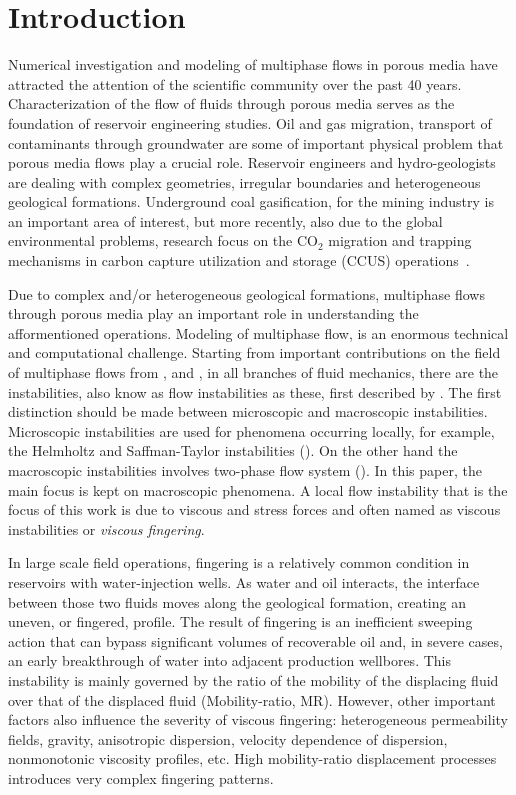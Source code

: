 \documentclass[preprint,authoryear,12pt]{elsarticle}
\begin{document}
\section{Introduction}\label{section:intro}
\medskip
Numerical investigation and modeling of multiphase flows in porous media have attracted the attention of the scientific community over the past 40 years. Characterization of the flow of fluids through porous media serves as the foundation of reservoir engineering studies. Oil and gas migration, transport of contaminants through groundwater are some of important physical problem that porous media flows play a crucial role. Reservoir engineers and hydro-geologists are dealing with complex geometries, irregular boundaries and heterogeneous geological formations.  Underground coal gasification, for the mining industry is an important area of interest, but more recently, also due to the global environmental problems, research focus on the CO$_{\text{2}}$ migration and trapping mechanisms in carbon capture utilization and storage (CCUS) operations~\citep{spycher_2003, chen_2006, self_2012, pruess_1990c, white_1981,jiang_2011}.

\medskip
Due to complex and/or heterogeneous geological formations, multiphase flows through porous media play an important role in understanding the afformentioned operations. Modeling of multiphase flow, is an enormous technical and computational challenge. Starting from important contributions on the field of multiphase flows from \citet{wooding_1976}, \citet{homsy_1987} and \citet{adler_1988}, in all branches of fluid mechanics, there are the instabilities, also know as flow instabilities as these, first described by \citet{saffman_1958}. The first distinction should be made between microscopic and macroscopic instabilities. Microscopic instabilities are used for phenomena occurring locally, for example, the Helmholtz and Saffman-Taylor instabilities (\citep{saffman_1959}). On the other hand the macroscopic instabilities involves two-phase flow system (\citep{bottoni_1992}). In this paper, the main focus is kept on macroscopic phenomena. A local flow instability that is the focus of this work is due to viscous and stress forces and often named as viscous instabilities or \textit{viscous fingering}. 

\medskip
In large scale field operations, fingering is a relatively common condition in reservoirs with water-injection wells. As water and oil interacts, the interface between those two fluids moves along the geological formation, creating an uneven, or fingered, profile. The result of fingering is an inefficient sweeping action that can bypass significant volumes of recoverable oil and, in severe cases, an early breakthrough of water into adjacent production wellbores. This instability is mainly governed by the ratio of the mobility of the displacing fluid over that of the displaced fluid (Mobility-ratio, MR). %
However, other important factors also influence the severity of viscous fingering: heterogeneous permeability fields, gravity, anisotropic dispersion, velocity dependence of dispersion, nonmonotonic viscosity profiles, etc. High mobility-ratio displacement processes introduces very complex fingering patterns.  
\end{document}
